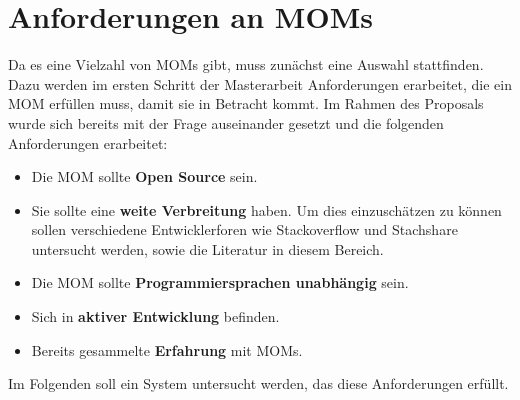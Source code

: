 \section{Anforderungen an MOMs}
\label{sec:anforderungenMom}
Da es eine Vielzahl von MOMs gibt, muss zunächst eine Auswahl stattfinden. Dazu werden im ersten Schritt der Masterarbeit Anforderungen erarbeitet, die ein MOM erfüllen muss, damit sie in Betracht kommt. Im Rahmen des Proposals wurde sich bereits mit der Frage auseinander gesetzt und die folgenden Anforderungen erarbeitet:
\begin{itemize}
\item Die MOM sollte \textbf{Open Source} sein.
\item Sie sollte eine \textbf{weite Verbreitung} haben. Um dies einzuschätzen zu können sollen verschiedene Entwicklerforen wie Stackoverflow und Stachshare untersucht werden, sowie die Literatur in diesem Bereich.
\item %
Die MOM sollte \textbf{Programmiersprachen unabhängig} sein.
\item Sich in \textbf{aktiver Entwicklung} befinden.
\item Bereits gesammelte \textbf{Erfahrung} mit MOMs.
\end{itemize}

Im Folgenden soll ein System untersucht werden, das diese Anforderungen erfüllt.

